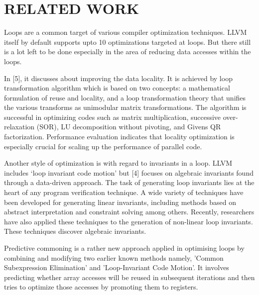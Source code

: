 \chapter{RELATED WORK} %
Loops are a common target of various compiler optimization techniques. LLVM itself by default supports upto 10 optimizations targeted at loops. But there still is a lot left to be done especially in the area of reducing data accesses within the loops.

In [5], it discusses about improving the data locality. It is achieved by loop transformation algorithm which is based on two concepts: a mathematical formulation of reuse and locality, and a loop transformation theory that unifies the various transforms as unimodular matrix transformations. The algorithm is successful in optimizing codes such as matrix multiplication, successive over-relaxation (SOR), LU decomposition without pivoting, and Givens QR factorization. Performance evaluation indicates that locality optimization is especially crucial for scaling up the performance of parallel code.

Another style of optimization is with regard to invariants in a loop. LLVM includes ‘loop invariant code motion’ but [4] focuses on algebraic invariants found through a data-driven approach. The task of generating loop invariants lies at the heart of any program verification technique. A wide variety of techniques have been developed for generating linear invariants, including methods based on abstract interpretation and constraint solving among others. Recently, researchers have also applied these techniques to the generation of non-linear loop invariants. These techniques discover algebraic invariants.

Predictive commoning is a rather new approach applied in optimising loops by combining and modifying two earlier known methods namely, ’Common Subexpression Elimination’ and ’Loop-Invariant Code Motion’. It involves predicting whether array accesses will be reused in subsequent iterations and then tries to optimize those accesses by promoting them to registers.